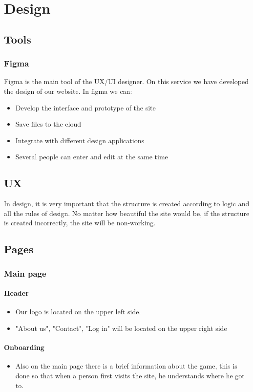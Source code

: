 \chapter{Design}\label{ch:design}
\section{Tools}
	\subsection{Figma}
	Figma is the main tool of the UX/UI designer. On this service we have developed the design of our website. In figma we can:
	\begin{itemize}
		\item Develop the interface and prototype of the site
		\item Save files to the cloud
		\item Integrate with different design applications
		\item Several people can enter and edit at the same time
	\end{itemize}
\section{UX}
In design, it is very important that the structure is created according to logic and all the rules of design. No matter how beautiful the site would be, if the structure is created incorrectly, the site will be non-working.

\section{Pages}
	\subsection{Main page}
		\subsubsection{Header}
		\begin{itemize}
			\item Our logo is located on the upper left side.
			\item "About us", "Contact", "Log in" will be located on the upper right side
		\end{itemize}
		\subsubsection{Onboarding}
		\begin{itemize}
			\item Also on the main page there is a brief information about the game, this is done so that when a person first visits the site, he understands where he got to.
		\end{itemize}
